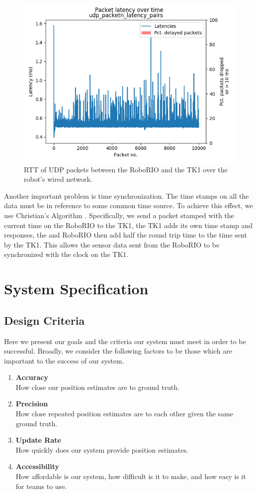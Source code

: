 \documentclass{article}
\begin{document}
		\begin{figure}[H]
			\centering
			\includegraphics[width=0.7\linewidth]{./images/rio_tk1_udp_latency_timeseries.png}
			\caption{RTT of UDP packets between the RoboRIO and the TK1 over the robot's wired network.}
			\label{fig:udp_timing}
		\end{figure}

		Another important problem is time synchronization. The time stamps on all the data must be in reference to some common time source. To achieve this effect, we use Christian's Algorithm \cite{cristian_probabilistic_1989}. Specifically, we send a packet stamped with the current time on the RoboRIO to the TK1, the TK1 adds its own time stamp and responses, the and RoboRIO then add half the round trip time to the time sent by the TK1. This allows the sensor data sent from the RoboRIO to be synchronized with the clock on the TK1.

\section{System Specification} \label{specs}

  \subsection{Design Criteria} \label{design_criteria}

    Here we present our goals and the criteria our system must meet in order to be successful. Broadly, we consider the following factors to be those which are important to the success of our system.
    \begin{enumerate}
      \item \textbf{Accuracy}\\ How close our position estimates are to ground truth.
      \item \textbf{Precision}\\ How close repeated position estimates are to each other given the same ground truth.
      \item \textbf{Update Rate}\\ How quickly does our system provide position estimates.
      \item \textbf{Accessibility}\\ How affordable is our system, how difficult is it to make, and how easy is it for teams to use.
    \end{enumerate}
\end{document}
